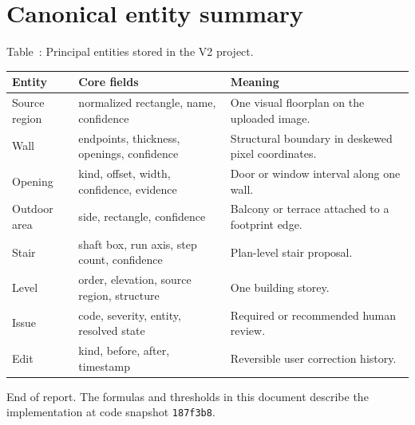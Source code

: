 \documentclass[11pt,a4paper]{article}
\newcommand{\code}[1]{\texttt{#1}}
\begin{document}
\clearpage
\section{Canonical entity summary}

\begin{center}
Table~\thetable: Principal entities stored in the V2 project.
\end{center}
\begin{tabularx}{\textwidth}{@{}p{27mm}p{47mm}X@{}}
\toprule
Entity & Core fields & Meaning \\
\midrule
Source region & normalized rectangle, name, confidence & One visual floorplan on the uploaded image. \\
Wall & endpoints, thickness, openings, confidence & Structural boundary in deskewed pixel coordinates. \\
Opening & kind, offset, width, confidence, evidence & Door or window interval along one wall. \\
Outdoor area & side, rectangle, confidence & Balcony or terrace attached to a footprint edge. \\
Stair & shaft box, run axis, step count, confidence & Plan-level stair proposal. \\
Level & order, elevation, source region, structure & One building storey. \\
Issue & code, severity, entity, resolved state & Required or recommended human review. \\
Edit & kind, before, after, timestamp & Reversible user correction history. \\
\bottomrule
\end{tabularx}

\vfill
\begin{center}
\color{Muted}\small
End of report. The formulas and thresholds in this document describe the implementation at code snapshot \code{187f3b8}.
\end{center}
\end{document}

